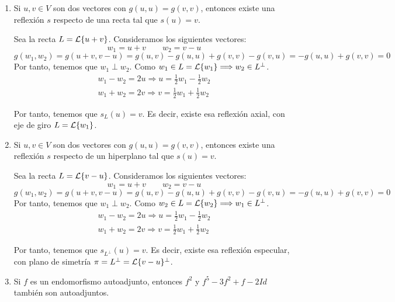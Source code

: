 \begin{ejercicio}
\begin{enumerate}
        \item Si $u,v \in V$ son dos vectores con $g(u, u) = g(v, v)$, entonces existe una reflexión $s$ respecto de una recta tal que $s(u) = v$.

        Sea la recta $L=\mathcal{L}\{u+v\}$. Consideramos los siguientes vectores: $$w_1=u+v \qquad w_2=v-u$$
        \begin{equation*}
            g( w_1, w_2) = g( u+v, v-u) = g( u,v) -g( u,u) +g( v,v) -g( v,u) = -g( u,u) +g( v,v) = 0 
        \end{equation*}
        Por tanto, tenemos que $w_1\perp w_2$. Como $w_1\in L=\mathcal{L}\{w_1\} \Longrightarrow w_2\in L^\perp$.
        \begin{gather*}
            w_1-w_2 = 2u \Longrightarrow u=\frac{1}{2}w_1 - \frac{1}{2}w_2 \\
            w_1+w_2 = 2v \Longrightarrow v=\frac{1}{2}w_1 + \frac{1}{2}w_2
        \end{gather*}
    
        Por tanto, tenemos que $s_L(u)=v$. Es decir, existe esa reflexión axial, con eje de giro $L=\mathcal{L}\{w_1\}$.

        \item Si $u,v \in V$ son dos vectores con $g(u, u) = g(v, v)$, entonces existe una reflexión $s$ respecto de un hiperplano tal que $s(u) = v$.

        Sea la recta $L=\mathcal{L}\{v-u\}$. Consideramos los siguientes vectores: $$w_1=u+v \qquad w_2=v-u$$
        \begin{equation*}
            g( w_1, w_2) = g( u+v, v-u) = g( u,v) -g( u,u) +g( v,v) -g( v,u) = -g( u,u) +g( v,v) = 0 
        \end{equation*}
        Por tanto, tenemos que $w_1\perp w_2$. Como $w_2\in L=\mathcal{L}\{w_2\} \Longrightarrow w_1\in L^\perp$.
        \begin{gather*}
            w_1-w_2 = 2u \Longrightarrow u=\frac{1}{2}w_1 - \frac{1}{2}w_2 \\
            w_1+w_2 = 2v \Longrightarrow v=\frac{1}{2}w_1 + \frac{1}{2}w_2
        \end{gather*}
    
        Por tanto, tenemos que $s_{L^\perp}(u)=v$. Es decir, existe esa reflexión especular, con plano de simetría $\pi=L^\perp = \mathcal{L}\{v-u\}^\perp$.

        \item Si $f$ es un endomorfismo autoadjunto, entonces $f^2$ y $f^5 - 3f^2 + f - 2Id$ también son autoadjuntos.


\end{enumerate}
\end{ejercicio}
